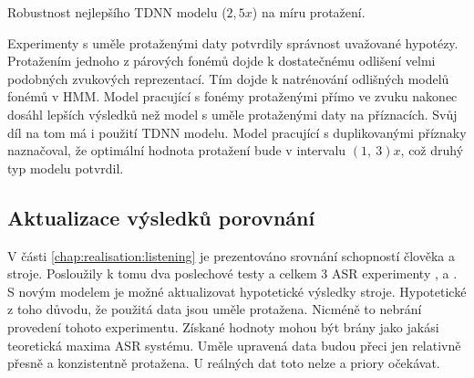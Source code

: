 \begin{table}[htpb]
  \centering
  \def\arraystretch{1.5}
  \caption{Robustnost nejlepšího TDNN modelu ($2,5x$) na míru protažení.}
  \label{tab:realisation:augmentation:influence:tdnn:robust}
\end{table}

Experimenty s uměle protaženými daty potvrdily správnost uvažované hypotézy. Protažením jednoho z párových fonémů dojde k dostatečnému odlišení velmi podobných zvukových reprezentací. Tím dojde k natrénování odlišných modelů fonémů v HMM. Model pracující s fonémy protaženými přímo ve zvuku nakonec dosáhl lepších výsledků než model s uměle protaženými daty na příznacích. Svůj díl na tom má i použití TDNN modelu. Model pracující s duplikovanými příznaky naznačoval, že optimální hodnota protažení bude v intervalu $\left(1,\ 3\right)x$, což druhý typ modelu potvrdil.

\subsection{Aktualizace výsledků porovnání}
\label{chap:realisation:augmentation:comparison}

V části \ref{chap:realisation:listening} je prezentováno srovnání schopností člověka a stroje. Posloužily k tomu dva poslechové testy a celkem $3$ ASR experimenty ,  a . S novým modelem je možné aktualizovat hypotetické výsledky stroje. Hypotetické z toho důvodu, že použitá data jsou uměle protažena. Nicméně to nebrání provedení tohoto experimentu. Získané hodnoty mohou být brány jako jakási teoretická maxima ASR systému. Uměle upravená data budou přeci jen relativně přesně a konzistentně protažena. U reálných dat toto nelze a priory očekávat.


